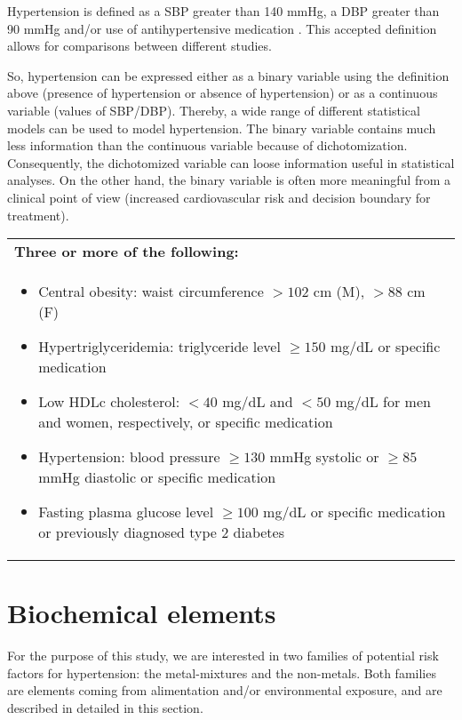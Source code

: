 Hypertension is defined as a SBP greater than 140 mmHg, a DBP greater than 90 mmHg and/or use of antihypertensive medication \cite{kearney_global_2005,kearney_worldwide_2004}. This accepted definition allows for comparisons between different studies. 

So, hypertension can be expressed either as a binary variable using the definition above (presence of hypertension or absence of hypertension) or as a continuous variable (values of SBP/DBP). Thereby, a wide range of different statistical models can be used to model hypertension. The binary variable contains much less information than the continuous variable because of dichotomization. Consequently, the dichotomized variable can loose information useful in statistical analyses. On the other hand, the binary variable is often more meaningful from a clinical point of view (increased cardiovascular risk and decision boundary for treatment).

\begin{table}
\centering
\small
{}
\begin{tabular}{ p{} }
\toprule
\bf{Three or more of the following:} \\
\begin{itemize}
\item Central obesity: waist circumference $>102$ cm (M), $>88$ cm (F) 
\item Hypertriglyceridemia: triglyceride level $\geq 150$ mg/dL or specific medication 
\item Low HDLc cholesterol: $<40$ mg/dL and $<50$ mg/dL for men and women, respectively, or specific medication 
\item Hypertension: blood pressure $\geq 130$ mmHg systolic or $\geq 85$ mmHg diastolic or specific medication 
\item Fasting plasma glucose level $\geq 100$ mg/dL or specific medication or previously diagnosed type 2 diabetes 
\end{itemize} \\
\bottomrule
\end{tabular}
\label{table:metabolic}
\end{table}

\section{Biochemical elements}
For the purpose of this study, we are interested in two families of potential risk factors for hypertension: the metal-mixtures and the non-metals. Both families are elements coming from alimentation and/or environmental exposure, and are described in detailed in this section.

